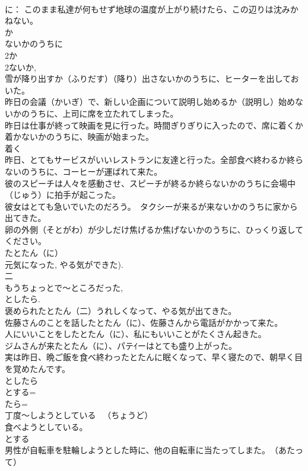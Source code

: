 \documentclass[8pt]{extreport}
\begin{document}
\begin{CJK}{UTF8}{min}
\\	に： このまま私達が何もせず地球の温度が上がり続けたら、この辺りは沈みかねない。 
\\	か
\\	ないかのうちに	
\\	2か
\\	2ないか, 
\\	雪が降り出すか（ふりだす）（降り）出さないかのうちに、ヒーターを出しておいた。 
\\	昨日の会議（かいぎ）で、新しい企画について説明し始めるか（説明し）始めないかのうちに、上司に席を立たれてしまった。 
\\	昨日は仕事が終って映画を見に行った。時間ぎりぎりに入ったので、席に着くか着かないかのうちに、映画が始まった。 
\\	着く 
\\	昨日、とてもサービスがいいレストランに友達と行った。全部食べ終わるか終らないのうちに、コーヒーが運ばれて来た。 
\\	彼のスピーチは人々を感動させ、スピーチが終るか終らないかのうちに会場中（じゅう）に拍手が起こった。 
\\	彼女はとても急いでいたのだろう。　タクシーが来るが来ないかのうちに家から出てきた。 
\\	卵の外側（そとがわ）が少しだけ焦げるか焦げないかのうちに、ひっくり返してください。 
\\	たとたん（に） 
\\	元気になった, やる気ができた). 
\\	二 
\\	もうちょっとで～ところだった, 
\\	としたら. 
\\	褒められたとたん（二）うれしくなって、やる気が出てきた。 
\\	佐藤さんのことを話したとたん（に）、佐藤さんから電話がかかって来た。 
\\	人にいいことをしたとたん（に）、私にもいいことがたくさん起きた。 
\\	ジムさんが来たとたん（に）、パテｲーはとても盛り上がった。 
\\	実は昨日、晩ご飯を食べ終わったとたんに眠くなって、早く寝たので、朝早く目を覚めたんです。 
\\	としたら 
\\	とする=
\\	たら=
\\	丁度～しようとしている 　（ちょうど） 
\\	食べようとしている。 
\\	とする 
\\	男性が自転車を駐輪しようとした時に、他の自転車に当たってしまた。　（あたって） 

\end{CJK}
\end{document}
